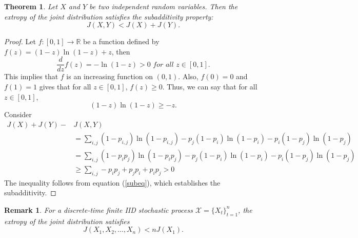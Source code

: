 \documentclass[pdflatex]{sn-jnl}%
\theoremstyle{thmstyleone}
\newtheorem{theorem}{Theorem}
\theoremstyle{thmstyletwo}%
\theoremstyle{thmstylethree}%
\newtheorem{remark}{Remark}%
\begin{document}
\begin{theorem}
Let \( X \) and \( Y \) be two independent random variables. Then the extropy of the joint distribution satisfies the subadditivity property:
\[
J(X, Y) < J(X) + J(Y).
\]
\end{theorem}
\begin{proof}
    Let $f:[0,1] \to \mathbb{R}$ be a function defined by $f(z)=(1-z)\ln(1-z)+z$, then
    \begin{equation}
        \frac{d}{dz}f(z)=-\ln(1-z)>0 \textit{ \ \ for all $z \in [0,1]$.}
    \end{equation}
This implies that $f$ is an increasing function on $(0,1)$. Also, $f(0)=0$ and $f(1)=1$ gives that for all $z\in [0,1]$, $f(z)\geq 0$.
Thus, we can say that for all $z\in [0,1]$, 
\begin{equation}\label{subeq}
    (1-z)\ln(1-z)\geq -z.
\end{equation}
Consider
\begin{equation}
\begin{split}
    J(X)+J(Y)-&J(X,Y) \\ &=\sum_{i,j}\left(1-p_{i,j}\right)\ln\left(1-p_{i,j}\right)-p_j\left(1-p_{i}\right)\ln\left(1-p_{i}\right)-p_i\left(1-p_{j}\right)\ln\left(1-p_{j}\right) \\
    &=\sum_{i,j}\left(1-p_{i}p_j\right)\ln\left(1-p_{i}p_j\right)-p_j\left(1-p_{i}\right)\ln\left(1-p_{i}\right)-p_i\left(1-p_{j}\right)\ln\left(1-p_{j}\right) \\
    &\geq \sum_{i,j} -p_i p_j+p_jp_i +p_ip_j>0 
\end{split}
\end{equation}
The inequality follows from equation (\ref{subeq}), which establishes the subadditivity.
\end{proof}
\begin{remark}
For a discrete-time finite IID stochastic process \(\mathcal{X}= \{X_t\}_{t=1}^n \), the extropy of the joint distribution satisfies
\[
J(X_1, X_2, \ldots, X_n) < n J(X_1).
\]
\end{remark}
\end{document}

